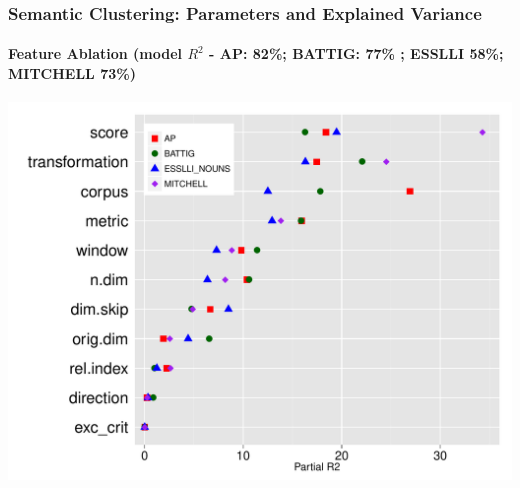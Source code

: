 \documentclass[t]{beamer} %
\begin{document}
\begin{frame}
  \frametitle{Semantic Clustering: Parameters and Explained Variance}
  \framesubtitle{Feature Ablation  (model $R^{2}$ - AP: 82\%;  BATTIG: 77\% ; ESSLLI  58\%; MITCHELL 73\%)}
  \centering
  \hspace*{-10pt}
  \includegraphics[scale=0.45]{img/lapesa_clustering_main_r2_reduced}

\end{frame}
\end{document}
